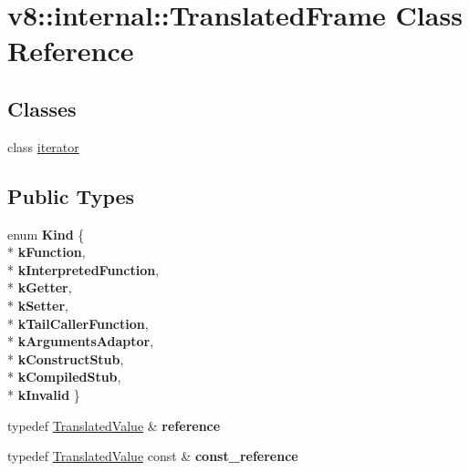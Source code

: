 \hypertarget{classv8_1_1internal_1_1_translated_frame}{}\section{v8\+:\+:internal\+:\+:Translated\+Frame Class Reference}
\label{classv8_1_1internal_1_1_translated_frame}
\subsection*{Classes}
\begin{DoxyCompactItemize}
\item 
class \hyperlink{classv8_1_1internal_1_1_translated_frame_1_1iterator}{iterator}
\end{DoxyCompactItemize}
\subsection*{Public Types}
\begin{DoxyCompactItemize}
\item 
enum {\bfseries Kind} \{ \\*
{\bfseries k\+Function}, 
\\*
{\bfseries k\+Interpreted\+Function}, 
\\*
{\bfseries k\+Getter}, 
\\*
{\bfseries k\+Setter}, 
\\*
{\bfseries k\+Tail\+Caller\+Function}, 
\\*
{\bfseries k\+Arguments\+Adaptor}, 
\\*
{\bfseries k\+Construct\+Stub}, 
\\*
{\bfseries k\+Compiled\+Stub}, 
\\*
{\bfseries k\+Invalid}
 \}\hypertarget{classv8_1_1internal_1_1_translated_frame_aa6931f8e7c4e1e1bf42252d1d8e1bf9d}{}\label{classv8_1_1internal_1_1_translated_frame_aa6931f8e7c4e1e1bf42252d1d8e1bf9d}

\item 
typedef \hyperlink{classv8_1_1internal_1_1_translated_value}{Translated\+Value} \& {\bfseries reference}\hypertarget{classv8_1_1internal_1_1_translated_frame_a729f1e8f225634f1ecf4e88e93ed70ae}{}\label{classv8_1_1internal_1_1_translated_frame_a729f1e8f225634f1ecf4e88e93ed70ae}

\item 
typedef \hyperlink{classv8_1_1internal_1_1_translated_value}{Translated\+Value} const \& {\bfseries const\+\_\+reference}\hypertarget{classv8_1_1internal_1_1_translated_frame_a598659983fe92a1b0f6853c97582c5cc}{}\label{classv8_1_1internal_1_1_translated_frame_a598659983fe92a1b0f6853c97582c5cc}

\end{DoxyCompactItemize}
